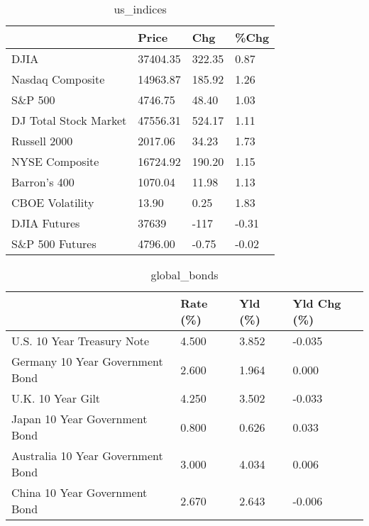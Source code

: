 \documentclass{article}%
\begin{document}
%


\begin{table}[htbp]%
\caption{us\_indices}%
\centering%
\begin{adjustbox}{width=1\textwidth}%
\begin{tabular}{llll}
\toprule
                      &    Price &    Chg &  \%Chg \\
\midrule
                 DJIA & 37404.35 & 322.35 &  0.87 \\
     Nasdaq Composite & 14963.87 & 185.92 &  1.26 \\
              S\&P 500 &  4746.75 &  48.40 &  1.03 \\
DJ Total Stock Market & 47556.31 & 524.17 &  1.11 \\
         Russell 2000 &  2017.06 &  34.23 &  1.73 \\
       NYSE Composite & 16724.92 & 190.20 &  1.15 \\
         Barron's 400 &  1070.04 &  11.98 &  1.13 \\
      CBOE Volatility &    13.90 &   0.25 &  1.83 \\
         DJIA Futures &    37639 &   -117 & -0.31 \\
      S\&P 500 Futures &  4796.00 &  -0.75 & -0.02 \\
\bottomrule
\end{tabular}
%
\end{adjustbox}%
\end{table}

%


\begin{table}[htbp]%
\caption{global\_bonds}%
\centering%
\begin{adjustbox}{width=1\textwidth}%
\begin{tabular}{llll}
\toprule
                                  & Rate (\%) & Yld (\%) & Yld Chg (\%) \\
\midrule
       U.S. 10 Year Treasury Note &    4.500 &   3.852 &      -0.035 \\
  Germany 10 Year Government Bond &    2.600 &   1.964 &       0.000 \\
                U.K. 10 Year Gilt &    4.250 &   3.502 &      -0.033 \\
    Japan 10 Year Government Bond &    0.800 &   0.626 &       0.033 \\
Australia 10 Year Government Bond &    3.000 &   4.034 &       0.006 \\
    China 10 Year Government Bond &    2.670 &   2.643 &      -0.006 \\
\bottomrule
\end{tabular}
%
\end{adjustbox}%
\end{table}
\end{document}
